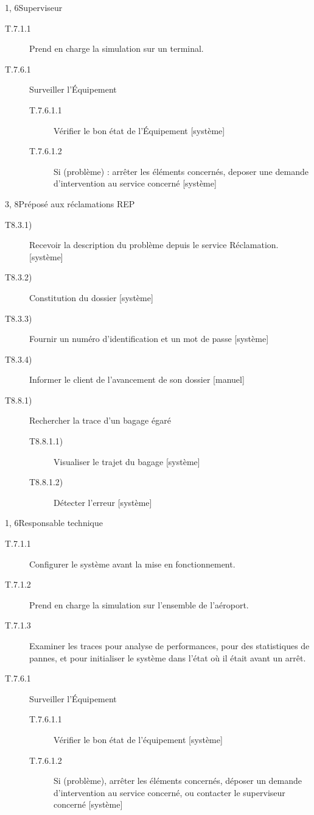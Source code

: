 \dta
{1, 6}{Superviseur}
{}
{
\begin{description}
	\item[T.7.1.1] Prend en charge la simulation sur un terminal.
	\item[T.7.6.1] Surveiller l'Équipement 
	\begin{description}
		\item[T.7.6.1.1] Vérifier le bon état de l'Équipement [système]
		\item[T.7.6.1.2] Si (problème) : arrêter les éléments concernés, deposer une demande d'intervention au service concerné [système]
	\end{description}
\end{description}
}

\dta
{3, 8}{Préposé aux réclamations}
{REP}
{
\begin{description}
	\item [T8.3.1)] Recevoir la description du problème depuis le service \og Réclamation\fg. [système]
	\item [T8.3.2)] Constitution du dossier [système] 
	\item [T8.3.3)] Fournir un numéro d'identification et un mot de passe [système]
	\item [T8.3.4)] Informer le client de l'avancement de son dossier [manuel]
	\item [T8.8.1)] Rechercher la trace d'un bagage égaré
	\begin{description}
		\item [T8.8.1.1)] Visualiser le trajet du bagage [système]
		\item [T8.8.1.2)] Détecter l'erreur [système]
	\end{description}
\end{description}
}

\dta
{1, 6}{Responsable technique}
{}
{
\begin{description}
	\item[T.7.1.1] Configurer le système avant la mise en fonctionnement.
	\item[T.7.1.2] Prend en charge la simulation sur l'ensemble de l'aéroport.
	\item[T.7.1.3] Examiner les traces pour analyse de performances, pour des statistiques de pannes, et pour initialiser le système dans l'état où il était avant un arrêt.
	\item[T.7.6.1] Surveiller l'Équipement
	\begin{description}
		\item[T.7.6.1.1] Vérifier le bon état de l'équipement [système]
		\item[T.7.6.1.2] Si (problème), arrêter les éléments concernés, déposer un
		demande d'intervention au service concerné, ou contacter le superviseur concerné [système]
	\end{description}
\end{description}
}

